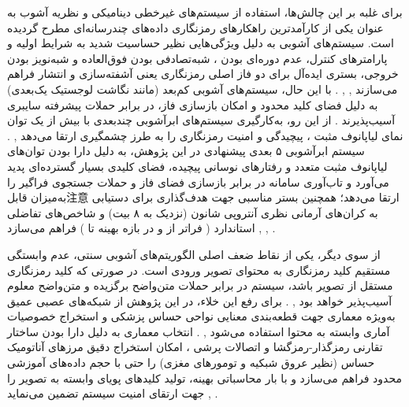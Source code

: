 برای غلبه بر این چالش‌ها، استفاده از سیستم‌های غیرخطی دینامیکی و نظریه آشوب به عنوان یکی از کارآمدترین راهکارهای رمزنگاری داده‌های چندرسانه‌ای مطرح گردیده است. سیستم‌های آشوبی به دلیل ویژگی‌هایی نظیر حساسیت شدید به شرایط اولیه و پارامترهای کنترل، عدم دوره‌ای بودن ، شبه‌تصادفی بودن فوق‌العاده و شبه‌نویز بودن خروجی، بستری ایده‌آل برای دو فاز اصلی رمزنگاری یعنی آشفته‌سازی  و انتشار  فراهم می‌سازند , , . با این حال، سیستم‌های آشوبی کم‌بعد (مانند نگاشت لوجستیک یک‌بعدی) به دلیل فضای کلید محدود و امکان بازسازی فاز، در برابر حملات پیشرفته سایبری آسیب‌پذیرند . از این رو، به‌کارگیری سیستم‌های ابرآشوبی چندبعدی  با بیش از یک توان نمای لیاپانوف مثبت ، پیچیدگی و امنیت رمزنگاری را به طرز چشمگیری ارتقا می‌دهد , . سیستم ابرآشوبی ۵ بعدی پیشنهادی در این پژوهش، به دلیل دارا بودن توان‌های لیاپانوف مثبت متعدد و رفتارهای نوسانی پیچیده، فضای کلیدی بسیار گسترده‌ای پدید می‌آورد و تاب‌آوری سامانه در برابر بازسازی فضای فاز  و حملات جستجوی فراگیر  را به‌میزان قابل‌注意 ارتقا می‌دهد؛ همچنین بستر مناسبی جهت هدف‌گذاری برای دستیابی به کران‌های آرمانی نظری آنتروپی شانون (نزدیک به ۸ بیت) و شاخص‌های تفاضلی استاندارد ( فراتر از  و  در بازه بهینه  تا ) فراهم می‌سازد , , .\par



از سوی دیگر، یکی از نقاط ضعف اصلی الگوریتم‌های آشوبی سنتی، عدم وابستگی مستقیم کلید رمزنگاری به محتوای تصویر ورودی است. در صورتی که کلید رمزنگاری مستقل از تصویر باشد، سیستم در برابر حملات متن‌واضح برگزیده  و متن‌واضح معلوم  آسیب‌پذیر خواهد بود , . برای رفع این خلاء، در این پژوهش از شبکه‌های عصبی عمیق به‌ویژه معماری  جهت قطعه‌بندی معنایی نواحی حساس پزشکی  و استخراج خصوصیات آماری وابسته به محتوا استفاده می‌شود , . انتخاب معماری  به دلیل دارا بودن ساختار تقارنی رمزگذار{-}رمزگشا  و اتصالات پرشی ، امکان استخراج دقیق مرزهای آناتومیک حساس (نظیر عروق شبکیه و تومورهای مغزی) را حتی با حجم داده‌های آموزشی محدود فراهم می‌سازد و با بار محاسباتی بهینه، تولید کلیدهای پویای وابسته به تصویر را جهت ارتقای امنیت سیستم تضمین می‌نماید , .\par

